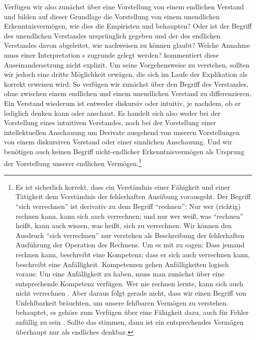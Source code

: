 Verfügen wir also zunächst über eine Vorstellung von einem endlichen Verstand
und bilden auf dieser Grundlage die Vorstellung von einem unendlichen
Erkenntnisvermögen, wie dies die Empiristen
 und 
behaupten? Oder ist der Begriff des unendlichen Verstandes ursprünglich gegeben
und der des endlichen Verstandes davon abgeleitet, wie
 nachweisen zu können glaubt?
Welche Annahme muss einer Interpretation s zugrunde gelegt
werden?  kommentiert diese Auseinandersetzung nicht
explizit. Um seine Vorgehensweise zu verstehen, sollten wir jedoch
eine dritte Möglichkeit erwägen, die sich im Laufe der Explikation als
korrekt erweisen wird: So verfügen wir zunächst
über den Begriff des Verstandes, ohne zwischen einem endlichen und
einem unendlichen Verstand zu differenzieren. Ein Verstand wiederum ist entweder
diskursiv oder intuitiv, je nachdem, ob er lediglich denken kann oder anschaut.
Es handelt sich also weder bei der Vorstellung eines
intuitiven Verstandes, noch bei der Vorstellung einer intellektuellen Anschauung um Derivate ausgehend
von unseren Vorstellungen von einem diskursiven Verstand oder einer sinnlichen
Anschauung. Und wir benötigen auch keinen Begriff nicht-endlicher
Erkenntnisvermögen als Ursprung der Vorstellung unserer endlichen
Vermögen.\footnote{Es ist sicherlich korrekt, dass ein Verständnis einer
Fähigkeit und einer Tätigkeit dem Verständnis der fehlerhaften Ausübung vorausgeht.
Der Begriff \enquote{sich verrechnen} ist derivativ zu dem Begriff
\enquote{rechnen}: Nur wer (richtig) rechnen kann, kann
sich auch verrechnen; und nur wer weiß, was \enquote{rechnen} heißt,
kann auch wissen, was heißt, sich zu verrechnen. Wir können den Ausdruck \enquote{sich verrechnen} nur
verstehen als Beschreibung der fehlerhaften Ausführung der Operation des
Rechnens. Um es mit  zu sagen: Dass jemand rechnen kann, beschreibt eine Kompetenz; dass er
sich auch verrechnen kann, beschreibt eine Anfälligkeit.
Kompetenzen gehen Anfälligkeiten logisch voraus: Um eine Anfälligkeit zu haben,
muss man zunächst über eine entsprechende Kompetenz verfügen. Wer nie rechnen
lernte, kann sich auch nicht verrechnen \parencite[vgl. hierzu][\pno~60, 130\,f.]{Ryle:TheConceptofMind2002}.
Aber daraus folgt gerade nicht, dass wir einen Begriff von Unfehlbarkeit
bräuchten, um unsere fehlbaren Vermögen zu verstehen.
 behauptet, es gehöre zum
Verfügen über eine Fähigkeit dazu, auch für Fehler anfällig zu sein
\parencite[vgl.][130]{Ryle:TheConceptofMind2002}. Sollte das stimmen,
dann ist ein entsprechendes Vermögen überhaupt nur als endliches denkbar.}

